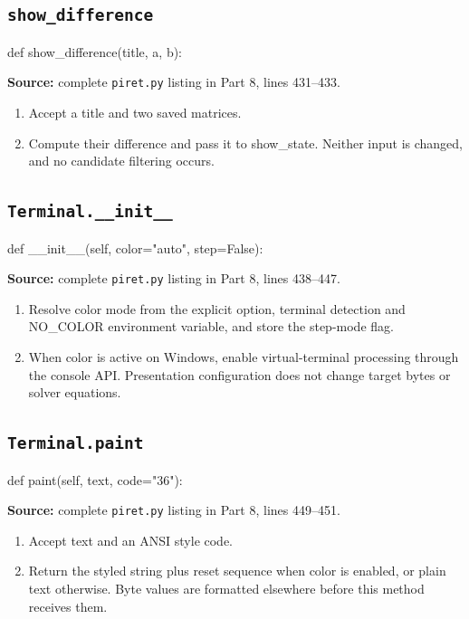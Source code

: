 \subsection{\texttt{show\_\allowbreak{}difference}}
\begin{lightcode}
def show_difference(title, a, b):
\end{lightcode}
\noindent\textbf{Source:} complete \texttt{piret.py} listing in Part 8, lines 431--433.
\begin{enumerate}
\item Accept a title and two saved matrices.
\item Compute their difference and pass it to show\_state. Neither input is changed, and no candidate filtering occurs.
\end{enumerate}
\subsection{\texttt{Terminal.\_\allowbreak{}\_\allowbreak{}init\_\allowbreak{}\_\allowbreak{}}}
\begin{lightcode}
def __init__(self, color="auto", step=False):
\end{lightcode}
\noindent\textbf{Source:} complete \texttt{piret.py} listing in Part 8, lines 438--447.
\begin{enumerate}
\item Resolve color mode from the explicit option, terminal detection and NO\_COLOR environment variable, and store the step-mode flag.
\item When color is active on Windows, enable virtual-terminal processing through the console API. Presentation configuration does not change target bytes or solver equations.
\end{enumerate}
\subsection{\texttt{Terminal.paint}}
\begin{lightcode}
def paint(self, text, code="36"):
\end{lightcode}
\noindent\textbf{Source:} complete \texttt{piret.py} listing in Part 8, lines 449--451.
\begin{enumerate}
\item Accept text and an ANSI style code.
\item Return the styled string plus reset sequence when color is enabled, or plain text otherwise. Byte values are formatted elsewhere before this method receives them.
\end{enumerate}
